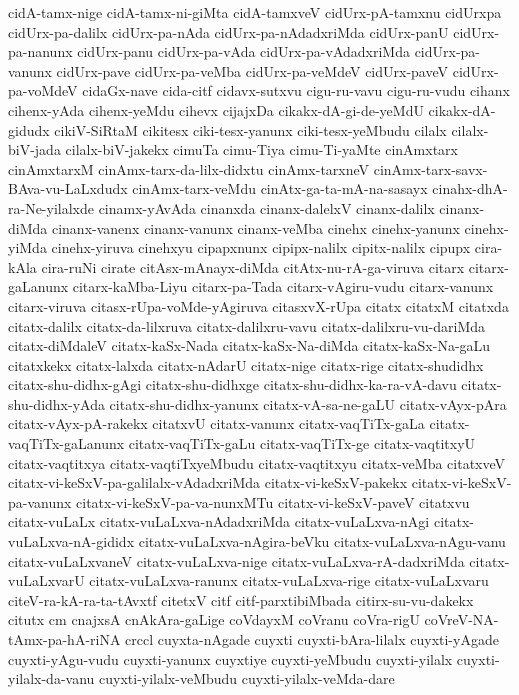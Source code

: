 {cidA-tamx-nige
cidA-tamx-ni-giMta
cidA-tamxveV
cidUrx-pA-tamxnu
cidUrxpa
cidUrx-pa-dalilx
cidUrx-pa-nAda
cidUrx-pa-nAdadxriMda
cidUrx-panU
cidUrx-pa-nanunx
cidUrx-panu
cidUrx-pa-vAda
cidUrx-pa-vAdadxriMda
cidUrx-pa-vanunx
cidUrx-pave
cidUrx-pa-veMba
cidUrx-pa-veMdeV
cidUrx-paveV
cidUrx-pa-voMdeV
cidaGx-nave
cida-citf
cidavx-sutxvu
cigu-ru-vavu
cigu-ru-vudu
cihanx
cihenx-yAda
cihenx-yeMdu
cihevx
cijajxDa
cikakx-dA-gi-de-yeMdU
cikakx-dA-gidudx
cikiV-SiRtaM
cikitesx
ciki-tesx-yanunx
ciki-tesx-yeMbudu
cilalx
cilalx-biV-jada
cilalx-biV-jakekx
cimuTa
cimu-Tiya
cimu-Ti-yaMte
cinAmxtarx
cinAmxtarxM
cinAmx-tarx-da-lilx-didxtu
cinAmx-tarxneV
cinAmx-tarx-savx-BAva-vu-LaLxdudx
cinAmx-tarx-veMdu
cinAtx-ga-ta-mA-na-sasayx
cinahx-dhA-ra-Ne-yilalxde
cinamx-yAvAda
cinanxda
cinanx-dalelxV
cinanx-dalilx
cinanx-diMda
cinanx-vanenx
cinanx-vanunx
cinanx-veMba
cinehx
cinehx-yanunx
cinehx-yiMda
cinehx-yiruva
cinehxyu
cipapxnunx
cipipx-nalilx
cipitx-nalilx
cipupx
cira-kAla
cira-ruNi
cirate
citAsx-mAnayx-diMda
citAtx-nu-rA-ga-viruva
citarx
citarx-gaLanunx
citarx-kaMba-Liyu
citarx-pa-Tada
citarx-vAgiru-vudu
citarx-vanunx
citarx-viruva
citasx-rUpa-voMde-yAgiruva
citasxvX-rUpa
citatx
citatxM
citatxda
citatx-dalilx
citatx-da-lilxruva
citatx-dalilxru-vavu
citatx-dalilxru-vu-dariMda
citatx-diMdaleV
citatx-kaSx-Nada
citatx-kaSx-Na-diMda
citatx-kaSx-Na-gaLu
citatxkekx
citatx-lalxda
citatx-nAdarU
citatx-nige
citatx-rige
citatx-shudidhx
citatx-shu-didhx-gAgi
citatx-shu-didhxge
citatx-shu-didhx-ka-ra-vA-davu
citatx-shu-didhx-yAda
citatx-shu-didhx-yanunx
citatx-vA-sa-ne-gaLU
citatx-vAyx-pAra
citatx-vAyx-pA-rakekx
citatxvU
citatx-vanunx
citatx-vaqTiTx-gaLa
citatx-vaqTiTx-gaLanunx
citatx-vaqTiTx-gaLu
citatx-vaqTiTx-ge
citatx-vaqtitxyU
citatx-vaqtitxya
citatx-vaqtiTxyeMbudu
citatx-vaqtitxyu
citatx-veMba
citatxveV
citatx-vi-keSxV-pa-galilalx-vAdadxriMda
citatx-vi-keSxV-pakekx
citatx-vi-keSxV-pa-vanunx
citatx-vi-keSxV-pa-va-nunxMTu
citatx-vi-keSxV-paveV
citatxvu
citatx-vuLaLx
citatx-vuLaLxva-nAdadxriMda
citatx-vuLaLxva-nAgi
citatx-vuLaLxva-nA-gididx
citatx-vuLaLxva-nAgira-beVku
citatx-vuLaLxva-nAgu-vanu
citatx-vuLaLxvaneV
citatx-vuLaLxva-nige
citatx-vuLaLxva-rA-dadxriMda
citatx-vuLaLxvarU
citatx-vuLaLxva-ranunx
citatx-vuLaLxva-rige
citatx-vuLaLxvaru
citeV-ra-kA-ra-ta-tAvxtf
citetxV
citf
citf-parxtibiMbada
citirx-su-vu-dakekx
citutx
cm
cnajxsA
cnAkAra-gaLige
coVdayxM
coVranu
coVra-rigU
coVreV-NA-tAmx-pa-hA-riNA
crccl
cuyxta-nAgade
cuyxti
cuyxti-bAra-lilalx
cuyxti-yAgade
cuyxti-yAgu-vudu
cuyxti-yanunx
cuyxtiye
cuyxti-yeMbudu
cuyxti-yilalx
cuyxti-yilalx-da-vanu
cuyxti-yilalx-veMbudu
cuyxti-yilalx-veMda-dare
}

